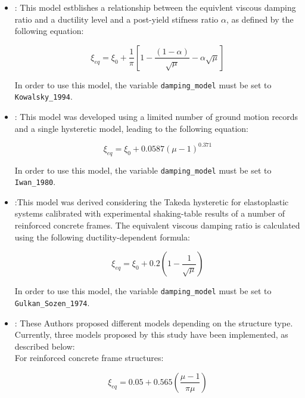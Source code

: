 \begin{itemize}
\item \cite{Kowalsky1994}: This model estblishes a relationship between the equivlent viscous damping ratio and a ductility level and a post-yield stifness ratio $\alpha$, as defined by the following equation:

\begin{equation}
\xi_{eq} = \xi_0 + \frac{1}{\pi}\left[1-\frac{(1-\alpha)}{\sqrt{\mu}} - \alpha\sqrt{\mu} \right]
\end{equation}

In order to use this model, the variable \verb=damping_model= must be set to \verb=Kowalsky_1994=.\\

\item \citep{Iwan1980}: This model was developed using a limited number of ground motion records and a single hysteretic model, leading to the following equation:

\begin{equation}
\xi_{eq} = \xi_0 + 0.0587\left(\mu-1\right)^0.371
\end{equation}

In order to use this model, the variable \verb=damping_model= must be set to \verb=Iwan_1980=.\\

\item \cite{GulkanSozen1974}:This model was derived considering the Takeda hysteretic for elastoplastic systems calibrated with experimental shaking-table results of a number of reinforced concrete frames. The equivalent viscous damping ratio is calculated using the following ductility-dependent formula:

\begin{equation}
\xi_{eq} = \xi_0 + 0.2\left(1- \frac{1}{\sqrt{\mu}}\right)
\end{equation}

In order to use this model, the variable \verb=damping_model= must be set to \verb=Gulkan_Sozen_1974=.\\

\item \cite{PriestleyEtAl2007}: These Authors proposed different models depending on the structure type. Currently, three models proposed by this study have been implemented, as described below: \\

For reinforced concrete frame structures:

\begin{equation}
\xi_{eq} = 0.05 + 0.565\left(\frac{\mu-1}{\pi\mu}\right)
\end{equation}


\end{itemize}
